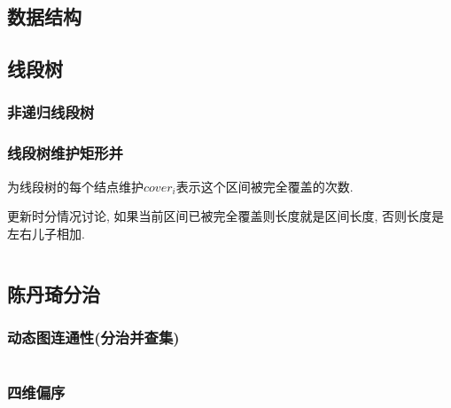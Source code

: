 \documentclass[a4paper, twoside]{article}
\begin{document}
\begin{multicols}{2}


			
		\newpage
		\section{数据结构}

			\subsection{线段树}
				\subsubsection{非递归线段树}
					
				
				\subsubsection{线段树维护矩形并}
					为线段树的每个结点维护$cover_i$表示这个区间被完全覆盖的次数.

					更新时分情况讨论, 如果当前区间已被完全覆盖则长度就是区间长度, 否则长度是左右儿子相加.
					\inputminted{cpp}{../src/datastructure/线段树维护矩形并.cpp}

					
	
			\subsection{陈丹琦分治}
				\subsubsection{动态图连通性(分治并查集)}
					\inputminted{cpp}{../src/datastructure/分治并查集.cpp}

				\subsubsection{四维偏序}
					\inputminted{cpp}{../src/datastructure/CDQ分治.cpp}
	

\end{multicols}
\end{document}
